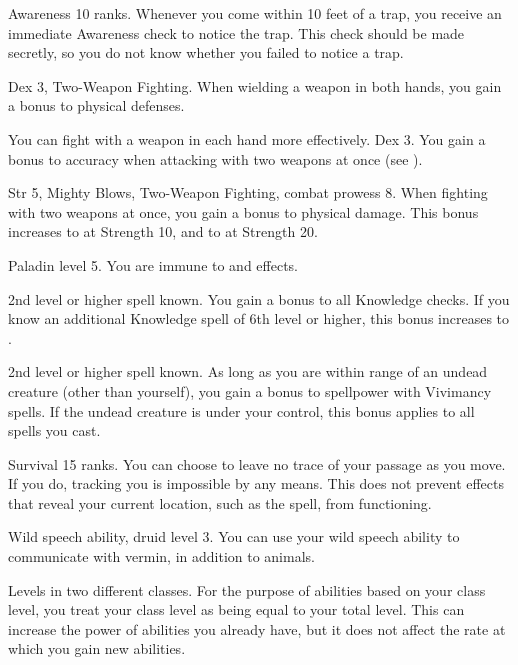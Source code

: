\featpre Awareness 10 ranks.
\featben Whenever you come within 10 feet of a trap, you receive an immediate Awareness check to notice the trap.
This check should be made secretly, so you do not know whether you failed to notice a trap.

\featpres Dex 3, Two-Weapon Fighting.
\featben When wielding a weapon in both hands, you gain a  bonus to physical defenses.

You can fight with a weapon in each hand more effectively.
\featpre Dex 3.
\featben You gain a  bonus to accuracy when attacking with two weapons at once (see ).

\featpres Str 5, Mighty Blows, Two-Weapon Fighting, combat prowess 8.
\featben When fighting with two weapons at once, you gain a  bonus to physical damage.
This bonus increases to  at Strength 10, and to  at Strength 20.

\featpre Paladin level 5.
\featben You are immune to  and  effects.

\featpre 2nd level or higher  spell known.
\featben You gain a  bonus to all Knowledge checks.
If you know an additional Knowledge spell of 6th level or higher, this bonus increases to .

\featpre 2nd level or higher  spell known.
\featben As long as you are within \rngclose range of an undead creature (other than yourself), you gain a  bonus to spellpower with Vivimancy spells.
If the undead creature is under your control, this bonus applies to all spells you cast.

\featpre Survival 15 ranks.
\featben You can choose to leave no trace of your passage as you move.
If you do, tracking you is impossible by any means.
This does not prevent effects that reveal your current location, such as the  spell, from functioning.

\featpre Wild speech ability, druid level 3.
\featben You can use your wild speech ability to communicate with vermin, in addition to animals.

\featpre Levels in two different classes.
\featben For the purpose of abilities based on your class level, you treat your class level as being equal to your total level.
This can increase the power of abilities you already have, but it does not affect the rate at which you gain new abilities.

